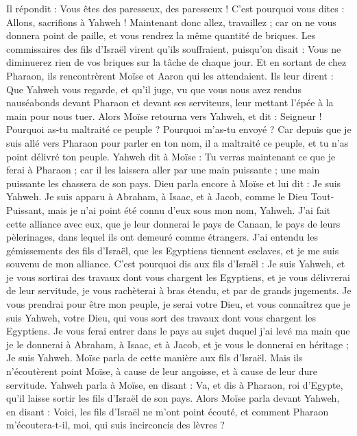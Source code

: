 \begin{multicols}{2}
Il répondit : Vous êtes des paresseux, des paresseux ! C'est pourquoi vous dites : Allons, sacrifions à Yahweh !
Maintenant donc allez, travaillez ; car on ne vous donnera point de paille, et vous rendrez la même quantité de briques.
Les commissaires des fils d'Israël virent qu'ils souffraient, puisqu'on disait : Vous ne diminuerez rien de vos briques sur la tâche de chaque jour.
Et en sortant de chez Pharaon, ils rencontrèrent Moïse et Aaron qui les attendaient.
Ils leur dirent : Que Yahweh vous regarde, et qu’il juge, vu que vous nous avez rendus nauséabonds devant Pharaon et devant ses serviteurs, leur mettant l'épée à la main pour nous tuer.
Alors Moïse retourna vers Yahweh, et dit : Seigneur ! Pourquoi as-tu maltraité ce peuple ? Pourquoi m'as-tu envoyé ?
Car depuis que je suis allé vers Pharaon pour parler en ton nom, il a maltraité ce peuple, et tu n'as point délivré ton peuple.
\VerseOne{}Yahweh dit à Moïse : Tu verras maintenant ce que je ferai à Pharaon ; car il les laissera aller par une main puissante ; une main puissante les chassera de son pays.
Dieu parla encore à Moïse et lui dit : Je suis Yahweh.
Je suis apparu à Abraham, à Isaac, et à Jacob, comme le Dieu Tout-Puissant, mais je n'ai point été connu d'eux sous mon nom, Yahweh.
J'ai fait cette alliance avec eux, que je leur donnerai le pays de Canaan, le pays de leurs pèlerinages, dans lequel ils ont demeuré comme étrangers.
J'ai entendu les gémissements des fils d'Israël, que les Egyptiens tiennent esclaves, et je me suis souvenu de mon alliance.
C'est pourquoi dis aux fils d'Israël : Je suis Yahweh, et je vous sortirai des travaux dont vous chargent les Egyptiens, et je vous délivrerai de leur servitude, je vous rachèterai à bras étendu, et par de grands jugements.
Je vous prendrai pour être mon peuple, je serai votre Dieu, et vous connaîtrez que je suis Yahweh, votre Dieu, qui vous sort des travaux dont vous chargent les Egyptiens.
Je vous ferai entrer dans le pays au sujet duquel j’ai levé ma main que je le donnerai à Abraham, à Isaac, et à Jacob, et je vous le donnerai en héritage ; Je suis Yahweh.
Moïse parla de cette manière aux fils d'Israël. Mais ils n'écoutèrent point Moïse, à cause de leur angoisse, et à cause de leur dure servitude.
Yahweh parla à Moïse, en disant :
Va, et dis à Pharaon, roi d'Egypte, qu'il laisse sortir les fils d'Israël de son pays.
Alors Moïse parla devant Yahweh, en disant : Voici, les fils d'Israël ne m'ont point écouté, et comment Pharaon m'écoutera-t-il, moi, qui suis incirconcis des lèvres ?

\end{multicols}
